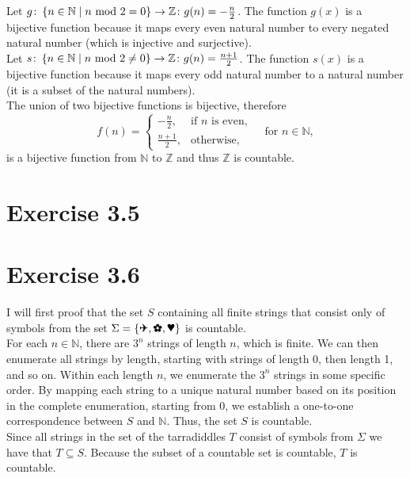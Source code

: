 \documentclass{article} %
\newcommand{\homeworkNumber}{3}
\newcommand{\plane}{\text{\ding{40}}}
\newcommand{\heart}{\text{\ding{95}}}
\newcommand{\flower}{\text{\ding{170}}}
\begin{document}
Let \( g \colon \left\{ n \in \mathbb{N} \mid n \text{ mod } 2 = 0 \\ \right\} \to \mathbb{Z} \colon g(n) = -\frac{n}{2} \).
The function \( g(x) \) is a bijective function because it maps every
even natural number to every negated natural number (which is injective and surjective). \\
Let \( s \colon \left\{ n \in \mathbb{N} \mid n \text{ mod } 2 \neq  0 \\ \right\} \to \mathbb{Z} \colon g(n) = \frac{n+1}{2} \).
The function \( s(x) \) is a bijective function because it maps every odd natural number to a natural number
(it is a subset of the natural numbers). \\
The union of two bijective functions is bijective, therefore
\begin{equation*}
	f(n) =
	\begin{cases}
		-\frac{n}{2},  & \text{if } n \text{ is even}, \\
		\frac{n+1}{2}, & \text{otherwise},
	\end{cases}
	\quad \text{for } n \in \mathbb{N},
\end{equation*}
is a bijective function from \( \mathbb{N} \) to \( \mathbb{Z} \) and thus \( \mathbb{Z} \) is countable.


\section*{Exercise \homeworkNumber.5}


\section*{Exercise \homeworkNumber.6}
I will first proof that the set \( S \) containing all finite strings that consist
only of symbols from the set \(  \Sigma = \left\{ \plane, \heart, \flower \right\}  \) is countable. \\
For each \( n \in \mathbb{N} \), there are \( 3^n \) strings of length \( n \), which is finite.
We can then enumerate all strings by length, starting with strings of length 0, then length 1, and so on.
Within each length \( n \), we enumerate the \( 3^n \) strings in some specific order.
By mapping each string to a unique natural number based on its position in the complete enumeration, starting from 0, we establish a one-to-one correspondence between \( S \) and \( \mathbb{N} \).
Thus, the set \( S \) is countable. \\
Since all strings in the set of the tarradiddles \( T \) consist of symbols from \( \Sigma \) we have that \( T \subseteq S \). Because the subset of a countable set is countable, \( T \) is countable.
\end{document}
